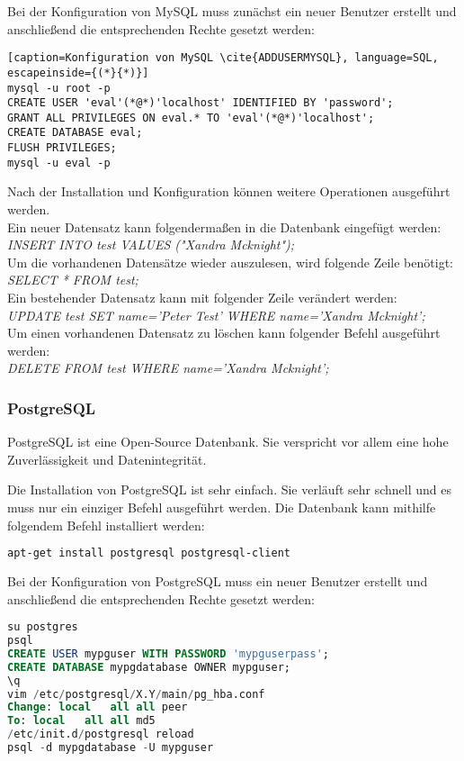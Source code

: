 \newpage

Bei der Konfiguration von MySQL muss zunächst ein neuer Benutzer erstellt und anschließend die entsprechenden Rechte gesetzt werden:
\begin{lstlisting}[caption=Konfiguration von MySQL \cite{ADDUSERMYSQL}, language=SQL, escapeinside={(*}{*)}]
mysql -u root -p
CREATE USER 'eval'(*@*)'localhost' IDENTIFIED BY 'password';
GRANT ALL PRIVILEGES ON eval.* TO 'eval'(*@*)'localhost';
CREATE DATABASE eval;
FLUSH PRIVILEGES;
mysql -u eval -p
\end{lstlisting}

Nach der Installation und Konfiguration können weitere Operationen ausgeführt werden.\\
Ein neuer Datensatz kann folgendermaßen in die Datenbank eingefügt werden:\\
\textit{INSERT INTO test VALUES ("Xandra Mcknight");}\\
Um die vorhandenen Datensätze wieder auszulesen, wird folgende Zeile benötigt:\\
\textit{SELECT * FROM test;}\\
Ein bestehender Datensatz kann mit folgender Zeile verändert werden:\\
\textit{UPDATE test SET name='Peter Test' WHERE name='Xandra Mcknight';}\\
Um einen vorhandenen Datensatz zu löschen kann folgender Befehl ausgeführt werden:\\
\textit{DELETE FROM test WHERE name='Xandra Mcknight';}

\subsubsection{PostgreSQL}
PostgreSQL ist eine Open-Source Datenbank. Sie verspricht vor allem eine hohe Zuverlässigkeit und Datenintegrität.\cite{ABOUTPOSTGRES}

Die Installation von PostgreSQL ist sehr einfach. Sie verläuft sehr schnell und es muss nur ein einziger Befehl ausgeführt werden. Die Datenbank kann mithilfe folgendem Befehl installiert werden:
\begin{lstlisting}[caption=Installation von PostgreSQL \cite{POSTGRES}, language=bash]
apt-get install postgresql postgresql-client
\end{lstlisting}

\newpage

Bei der Konfiguration von PostgreSQL muss ein neuer Benutzer erstellt und anschließend die entsprechenden Rechte gesetzt werden:
\begin{lstlisting}[caption=Konfiguration von PostgreSQL \cite{POSTGRES}, language=SQL]
su postgres
psql
CREATE USER mypguser WITH PASSWORD 'mypguserpass';
CREATE DATABASE mypgdatabase OWNER mypguser;
\q
vim /etc/postgresql/X.Y/main/pg_hba.conf
Change: local	all	all	peer
To: local	all	all	md5
/etc/init.d/postgresql reload
psql -d mypgdatabase -U mypguser
\end{lstlisting}

